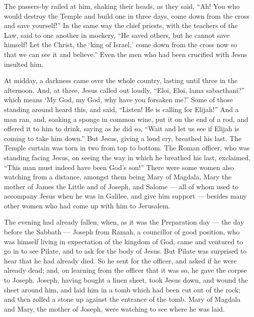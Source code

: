  The passers-by railed at him, shaking their heads, as they
said, ``Ah! You who would destroy the Temple and build one in three
days,  come down from the cross and save yourself!''
 In the same way the chief priests, with the teachers of
the Law, said to one another in mockery,  ``He saved
others, but he cannot save himself! Let the Christ, the `king of
Israel,' come down from the cross now so that we can see it and
believe.'' Even the men who had been crucified with Jesus insulted him.

 At midday, a darkness came over the whole country, lasting
until three in the afternoon.  And, at three, Jesus called
out loudly, ``Eloi, Eloi, lama sabacthani?'' which means `My God, my
God, why have you forsaken me?'  Some of those standing
around heard this, and said, ``Listen! He is calling for Elijah!''
 And a man ran, and, soaking a sponge in common wine, put
it on the end of a rod, and offered it to him to drink, saying as he did
so, ``Wait and let us see if Elijah is coming to take him down.''
 But Jesus, giving a loud cry, breathed his last.
 The Temple curtain was torn in two from top to bottom.
 The Roman officer, who was standing facing Jesus, on
seeing the way in which he breathed his last, exclaimed, ``This man must
indeed have been God's son!''  There were some women also
watching from a distance, amongst them being Mary of Magdala, Mary the
mother of James the Little and of Joseph, and Salome --- 
all of whom used to accompany Jesus when he was in Galilee, and give him
support --- besides many other women who had come up with him to
Jerusalem.

 The evening had already fallen, when, as it was the
Preparation day --- the day before the Sabbath ---  Joseph
from Ramah, a councillor of good position, who was himself living in
expectation of the kingdom of God, came and ventured to go in to see
Pilate, and to ask for the body of Jesus.  But Pilate was
surprised to hear that he had already died. So he sent for the officer,
and asked if he were already dead;  and, on learning from
the officer that it was so, he gave the corpse to Joseph. 
Joseph, having bought a linen sheet, took Jesus down, and wound the
sheet around him, and laid him in a tomb which had been cut out of the
rock; and then rolled a stone up against the entrance of the tomb.
 Mary of Magdala and Mary, the mother of Joseph, were
watching to see where he was laid.

